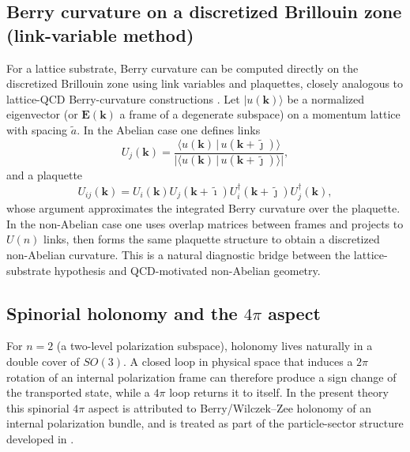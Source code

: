 \subsection{Berry curvature on a discretized Brillouin zone (link-variable method)}
\label{subsec:bz-berry}

For a lattice substrate, Berry curvature can be computed directly on the discretized Brillouin zone using
link variables and plaquettes, closely analogous to lattice-QCD Berry-curvature constructions
\citep{Fukui2005ChernDiscretizedBZ,PuYamamoto2018BerryLatticeQCD,Yamamoto2016BerryPhaseLatticeQCD}.
Let $\lvert u(\mathbf{k})\rangle$ be a normalized eigenvector (or $\mathbf{E}(\mathbf{k})$ a frame of a degenerate
subspace) on a momentum lattice with spacing $\tilde a$.
In the Abelian case one defines links
\begin{equation}
  U_j(\mathbf{k})=\frac{\langle u(\mathbf{k})\,|\,u(\mathbf{k}+\tilde{\jmath})\rangle}
  {|\langle u(\mathbf{k})\,|\,u(\mathbf{k}+\tilde{\jmath})\rangle|},
\end{equation}
and a plaquette
\begin{equation}
  U_{ij}(\mathbf{k}) = U_i(\mathbf{k})U_j(\mathbf{k}+\tilde{\imath})
  U_i^\dagger(\mathbf{k}+\tilde{\jmath})U_j^\dagger(\mathbf{k}),
\end{equation}
whose argument approximates the integrated Berry curvature over the plaquette.
In the non-Abelian case one uses overlap matrices between frames and projects to $U(n)$ links, then forms the same
plaquette structure to obtain a discretized non-Abelian curvature.
This is a natural diagnostic bridge between the lattice-substrate hypothesis and QCD-motivated non-Abelian geometry.
\subsection{\texorpdfstring{Spinorial holonomy and the $4\pi$ aspect}{Spinorial holonomy and the 4pi aspect}}

For $n=2$ (a two-level polarization subspace), holonomy lives naturally in a double cover of $SO(3)$.
A closed loop in physical space that induces a $2\pi$ rotation of an internal polarization frame can therefore
produce a sign change of the transported state, while a $4\pi$ loop returns it to itself.
In the present theory this spinorial $4\pi$ aspect is attributed to Berry/Wilczek--Zee holonomy of an internal
polarization bundle, and is treated as part of the particle-sector structure developed in .
